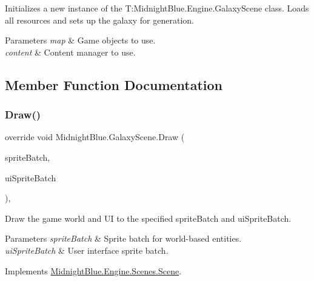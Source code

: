 Initializes a new instance of the T\+:\+Midnight\+Blue.\+Engine.\+Galaxy\+Scene class. Loads all resources and sets up the galaxy for generation. 


\begin{DoxyParams}{Parameters}
{\em map} & Game objects to use.\\
\hline
{\em content} & Content manager to use.\\
\hline
\end{DoxyParams}


\subsection{Member Function Documentation}
\hypertarget{class_midnight_blue_1_1_galaxy_scene_a3646fcf97e067bac267d42aad66e71c4}{}\label{class_midnight_blue_1_1_galaxy_scene_a3646fcf97e067bac267d42aad66e71c4} 
\subsubsection{\texorpdfstring{Draw()}{Draw()}}
{\footnotesize\ttfamily override void Midnight\+Blue.\+Galaxy\+Scene.\+Draw (\begin{DoxyParamCaption}\item[{Sprite\+Batch}]{sprite\+Batch,  }\item[{Sprite\+Batch}]{ui\+Sprite\+Batch }\end{DoxyParamCaption})\hspace{0.3cm}{\ttfamily [inline]}, {\ttfamily [virtual]}}



Draw the game world and UI to the specified sprite\+Batch and ui\+Sprite\+Batch. 


\begin{DoxyParams}{Parameters}
{\em sprite\+Batch} & Sprite batch for world-\/based entities.\\
\hline
{\em ui\+Sprite\+Batch} & User interface sprite batch.\\
\hline
\end{DoxyParams}


Implements \hyperlink{class_midnight_blue_1_1_engine_1_1_scenes_1_1_scene_a6ec0b4be6c7dc226c9afd308e1fb3fd3}{Midnight\+Blue.\+Engine.\+Scenes.\+Scene}.

